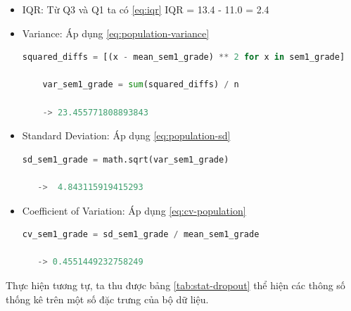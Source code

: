 \begin{itemize}
        \item IQR: Từ Q3 và Q1 ta có \ref{eq:iqr} IQR = 13.4 - 11.0 = 2.4
            

        \item Variance: Áp dụng \ref{eq:population-variance}
\begin{lstlisting}[language=Python]
   squared_diffs = [(x - mean_sem1_grade) ** 2 for x in sem1_grade]

    var_sem1_grade = sum(squared_diffs) / n

    -> 23.455771808893843
\end{lstlisting}

         \item Standard Deviation: Áp dụng \ref{eq:population-sd}
\begin{lstlisting}[language=Python]
   sd_sem1_grade = math.sqrt(var_sem1_grade)

   ->  4.843115919415293
\end{lstlisting}

          \item Coefficient of Variation: Áp dụng \ref{eq:cv-population}
\begin{lstlisting}[language=Python]
   cv_sem1_grade = sd_sem1_grade / mean_sem1_grade

   -> 0.4551449232758249
\end{lstlisting}
        \end{itemize}

    Thực hiện tương tự, ta thu được bảng \ref{tab:stat-dropout} thể hiện các thông số thống kê trên một số đặc trưng của bộ dữ liệu.    
    

